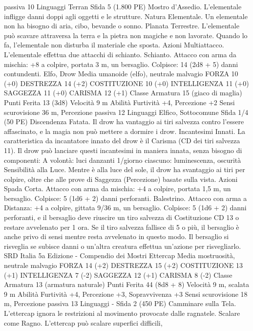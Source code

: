 \begin{multicols}{2}
passiva 10
Linguaggi Terran
Sfida 5 (1.800 PE)
Mostro d’Assedio. L’elementale infligge danni doppi agli oggetti
e le strutture.
Natura Elementale. Un elementale non ha bisogno di aria, cibo,
bevande o sonno.
Planata Terrestre. L’elementale può scavare attraversa la terra e
la pietra non magiche e non lavorate. Quando lo fa, l’elementale
non disturba il materiale che sposta.
Azioni
Multiattacco. L’elementale effettua due attacchi di schianto.
Schianto. Attacco con arma da mischia: +8 a colpire, portata 3
m, un bersaglio.
Colpisce: 14 (2d8 + 5) danni contundenti.
Elfo, Drow
Media umanoide (elfo), neutrale malvagio
FORZA 10 (+0)
DESTREZZA 14 (+2)
COSTITUZIONE 10 (+0)
INTELLIGENZA 11 (+0)
SAGGEZZA 11 (+0)
CARISMA 12 (+1)
Classe Armatura 15 (giaco di maglia)
Punti Ferita 13 (3d8)
Velocità 9 m
Abilità Furtività +4, Percezione +2
Sensi scurovisione 36 m, Percezione passiva 12
Linguaggi Elfico, Sottocomune
Sfida 1/4 (50 PE)
Discendenza Fatata. Il drow ha vantaggio ai tiri salvezza contro
l’essere affascinato, e la magia non può mettere a dormire i
drow.
Incantesimi Innati. La caratteristica da incantatore innato del
drow è il Carisma (CD dei tiri salvezza 11). Il drow può lanciare
questi incantesimi in maniera innata, senza bisogno di
componenti:
A volontà: luci danzanti
1/giorno ciascuno: luminescenza, oscurità
Sensibilità alla Luce. Mentre è alla luce del sole, il drow ha
svantaggio ai tiri per colpire, oltre che alle prove di Saggezza
(Percezione) basate sulla vista.
Azioni
Spada Corta. Attacco con arma da mischia: +4 a colpire, portata
1,5 m, un bersaglio.
Colpisce: 5 (1d6 + 2) danni perforanti.
Balestrino. Attacco con arma a Distanza: +4 a colpire, gittata
9/36 m, un bersaglio.
Colpisce: 5 (1d6 + 2) danni perforanti, e il bersaglio deve
riuscire un tiro salvezza di Costituzione CD 13 o restare
avvelenato per 1 ora. Se il tiro salvezza fallisce di 5 o più, il
bersaglio è anche privo di sensi mentre resta avvelenato in questo
modo. Il bersaglio si risveglia se subisce danni o un’altra
creatura effettua un’azione per risvegliarlo.
SRD Italia 5a Edizione - Compendio dei Mostri
Ettercap
Media mostruosità, neutrale malvagio
FORZA 14 (+2)
DESTREZZA 15 (+2)
COSTITUZIONE 13 (+1)
INTELLIGENZA 7 (-2)
SAGGEZZA 12 (+1)
CARISMA 8 (-2)
Classe Armatura 13 (armatura naturale)
Punti Ferita 44 (8d8 + 8)
Velocità 9 m, scalata 9 m
Abilità Furtività +4, Percezione +3, Sopravvivenza +3
Sensi scurovisione 18 m, Percezione passiva 13
Linguaggi -
Sfida 2 (450 PE)
Camminare sulla Tela. L’ettercap ignora le restrizioni al
movimento provocate dalle ragnatele.
Scalare come Ragno. L’ettercap può scalare superfici difficili,

\end{multicols}
